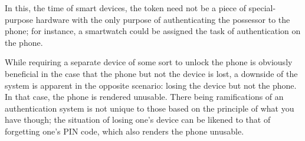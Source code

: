 \begin{enumerate}
\begin{itemize}
In this, the time of smart devices, the token need not be a piece of special-purpose hardware with the only purpose of authenticating the possessor to the phone; for instance, a smartwatch could be assigned the task of authentication on the phone.

While requiring a separate device of some sort to unlock the phone is obviously beneficial in the case that the phone but not the device is lost, a downside of the system is apparent in the opposite scenario: losing the device but not the phone. In that case, the phone is rendered unusable. There being ramifications of an authentication system is not unique to those based on the principle of what you have though; the situation of losing one's device can be likened to that of forgetting  one's PIN code, which also renders the phone unusable.
  \end{itemize}
\end{enumerate}
